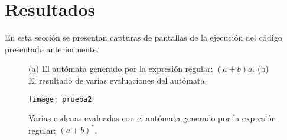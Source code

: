 \section{Resultados}

En esta sección se presentan capturas de pantallas de la ejecución del código presentado anteriormente.


\begin{figure}[H]
	\centering
	\caption{(a) El autómata generado por la expresión regular: $(a+b)a$. (b) El resultado de varias evaluaciones del autómata.}
	\label{fig:prueba1}
\end{figure}


\begin{figure}[H]
	\centering
	\texttt{[image: prueba2]}
	\caption{Varias cadenas evaluadas con el autómata generado por la expresión regular: $(a+b)^{*}$.}
	\label{fig:prueba2}
\end{figure}












